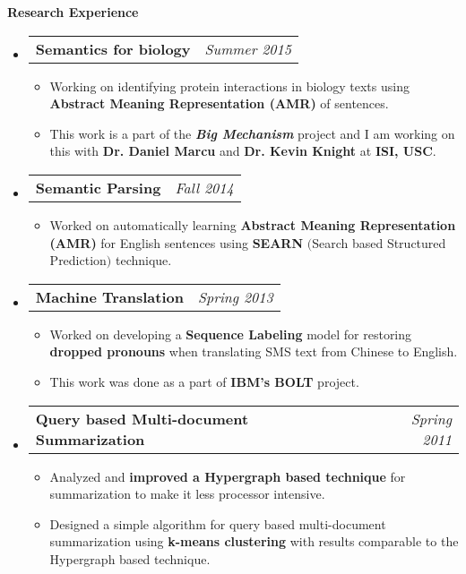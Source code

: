 \documentclass[letterpaper,12pt]{article}
\makeatletter
\newcommand{\resheading}[1]{{\large \colorbox{mygrey}{\begin{minipage}{\textwidth}{\textbf{#1 \vphantom{p\^{E}}}}\end{minipage}}}}
\newcommand{\projectitem}[2]{
\begin{tabular*}{6in}{l@{\extracolsep{\fill}}r}
		\textbf{#1} & \textit{#2} 
\end{tabular*}\vspace{-6pt}}
\makeatother
\begin{document}
\resheading{Research Experience}
\begin{itemize}
\item
\projectitem {Semantics for biology}{Summer 2015}
{\footnotesize
  \begin{itemize}
  \item Working on identifying protein interactions in biology texts using \textbf{Abstract Meaning Representation (AMR)} of sentences.
  \item This work is a part of the \textbf {\textit{Big Mechanism}} project and I am working on this with \textbf{Dr. Daniel Marcu} and \textbf{Dr. Kevin Knight} at \textbf{ISI, USC}.
  \end{itemize}
}
\item
\projectitem {Semantic Parsing}{Fall 2014}
{\footnotesize
  \begin{itemize}
  \item Worked on automatically learning \textbf{Abstract Meaning Representation (AMR)} for English sentences using \textbf{SEARN} $($Search based Structured Prediction$)$ technique.
  \end{itemize}
}
\item
\projectitem {Machine Translation}{Spring 2013}
{\footnotesize
  \begin{itemize}
  \item Worked on developing a \textbf{Sequence Labeling} model for restoring \textbf{dropped pronouns} when translating SMS text from Chinese to English.
  \item This work was done as a part of \textbf{IBM's BOLT} project.
  \end{itemize}
}

\item 
\projectitem  {Query based Multi-document Summarization}{Spring 2011}
{\footnotesize
  \begin{itemize}
  \item Analyzed and \textbf{improved a Hypergraph based technique} for summarization to make it less processor intensive.
  \item Designed a simple algorithm for query based multi-document summarization using \textbf{k-means clustering} with results comparable to the Hypergraph based technique.
  \end{itemize}
}
\end{itemize}
\end{document}
